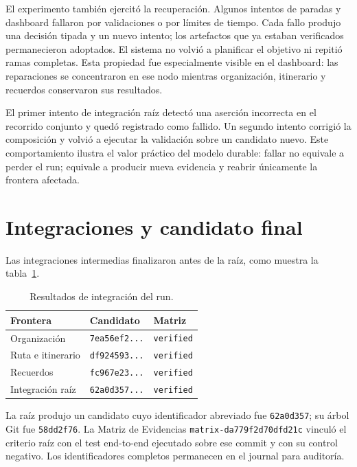 El experimento también ejercitó la recuperación. Algunos intentos de paradas y
dashboard fallaron por validaciones o por límites de tiempo. Cada fallo produjo
una decisión tipada y un nuevo intento; los artefactos que ya estaban verificados
permanecieron adoptados. El sistema no volvió a planificar el objetivo ni
repitió ramas completas. Esta propiedad fue especialmente visible en el
dashboard: las reparaciones se concentraron en ese nodo mientras organización,
itinerario y recuerdos conservaron sus resultados.

El primer intento de integración raíz detectó una aserción incorrecta en el
recorrido conjunto y quedó registrado como fallido. Un segundo intento corrigió
la composición y volvió a ejecutar la validación sobre un candidato nuevo. Este
comportamiento ilustra el valor práctico del modelo durable: fallar no equivale
a perder el run; equivale a producir nueva evidencia y reabrir únicamente la
frontera afectada.

\section{Integraciones y candidato final}

Las integraciones intermedias finalizaron antes de la raíz, como muestra la
tabla~\ref{tab:viaje-integraciones}.

\begin{table}[htbp]
  \centering
  \caption{Resultados de integración del run.}
  \label{tab:viaje-integraciones}
  \small
  \begin{tabularx}{\textwidth}{@{}l l l@{}}
    \toprule
    \textbf{Frontera} & \textbf{Candidato} & \textbf{Matriz} \\
    \midrule
    Organización & \texttt{7ea56ef2...} & \texttt{verified} \\
    Ruta e itinerario & \texttt{df924593...} & \texttt{verified} \\
    Recuerdos & \texttt{fc967e23...} & \texttt{verified} \\
    Integración raíz & \texttt{62a0d357...} & \texttt{verified} \\
    \bottomrule
  \end{tabularx}
\end{table}

La raíz produjo un candidato cuyo identificador abreviado fue
\texttt{62a0d357}; su árbol Git fue \texttt{58dd2f76}. La Matriz de Evidencias
\texttt{matrix-da779f2d70dfd21c} vinculó el criterio raíz con el test
end-to-end ejecutado sobre ese commit y con su control negativo. Los
identificadores completos permanecen en el journal para auditoría.

